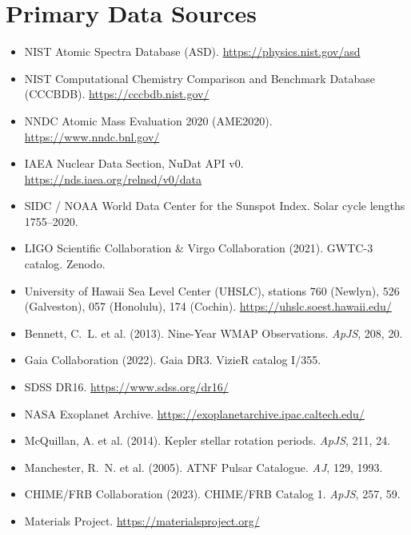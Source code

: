 \documentclass[11pt, letterpaper, openany]{book}
\begin{document}
\section*{Primary Data Sources}
\begin{itemize}
    \item NIST Atomic Spectra Database (ASD). \url{https://physics.nist.gov/asd}
    \item NIST Computational Chemistry Comparison and Benchmark Database (CCCBDB). \url{https://cccbdb.nist.gov/}
    \item NNDC Atomic Mass Evaluation 2020 (AME2020). \url{https://www.nndc.bnl.gov/}
    \item IAEA Nuclear Data Section, NuDat API v0. \url{https://nds.iaea.org/relnsd/v0/data}
    \item SIDC / NOAA World Data Center for the Sunspot Index. Solar cycle lengths 1755--2020.
    \item LIGO Scientific Collaboration \& Virgo Collaboration (2021). GWTC-3 catalog. Zenodo.
    \item University of Hawaii Sea Level Center (UHSLC), stations 760 (Newlyn), 526 (Galveston), 057 (Honolulu), 174 (Cochin). \url{https://uhslc.soest.hawaii.edu/}
    \item Bennett, C.~L. et al. (2013). Nine-Year WMAP Observations. \textit{ApJS}, 208, 20.
    \item Gaia Collaboration (2022). Gaia DR3. VizieR catalog I/355.
    \item SDSS DR16. \url{https://www.sdss.org/dr16/}
    \item NASA Exoplanet Archive. \url{https://exoplanetarchive.ipac.caltech.edu/}
    \item McQuillan, A. et al. (2014). Kepler stellar rotation periods. \textit{ApJS}, 211, 24.
    \item Manchester, R.~N. et al. (2005). ATNF Pulsar Catalogue. \textit{AJ}, 129, 1993.
    \item CHIME/FRB Collaboration (2023). CHIME/FRB Catalog 1. \textit{ApJS}, 257, 59.
    \item Materials Project. \url{https://materialsproject.org/}
\end{itemize}
\end{document}
